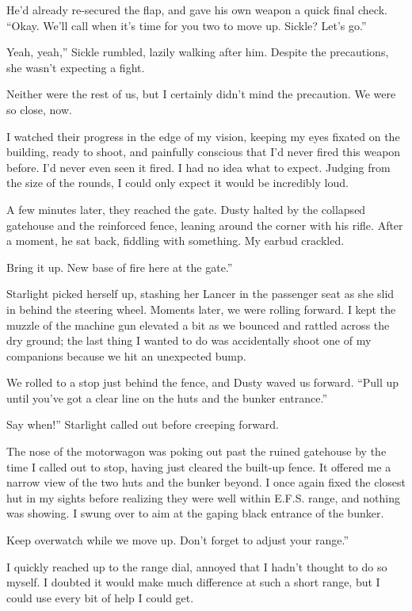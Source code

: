He’d already re-secured the flap, and gave his own weapon a quick final check. “Okay. We’ll call when it’s time for you two to move up. Sickle? Let’s go.”

\leavevmode{}Yeah, yeah,” Sickle rumbled, lazily walking after him. Despite the precautions, she wasn’t expecting a fight.

Neither were the rest of us, but I certainly didn’t mind the precaution. We were so close, now.

I watched their progress in the edge of my vision, keeping my eyes fixated on the building, ready to shoot, and painfully conscious that I’d never fired this weapon before. I’d never even seen it fired. I had no idea what to expect. Judging from the size of the rounds, I could only expect it would be incredibly loud.

A few minutes later, they reached the gate. Dusty halted by the collapsed gatehouse and the reinforced fence, leaning around the corner with his rifle. After a moment, he sat back, fiddling with something. My earbud crackled.

\leavevmode{}Bring it up. New base of fire here at the gate.”

Starlight picked herself up, stashing her Lancer in the passenger seat as she slid in behind the steering wheel. Moments later, we were rolling forward. I kept the muzzle of the machine gun elevated a bit as we bounced and rattled across the dry ground; the last thing I wanted to do was accidentally shoot one of my companions because we hit an unexpected bump.

We rolled to a stop just behind the fence, and Dusty waved us forward. “Pull up until you’ve got a clear line on the huts and the bunker entrance.”

\leavevmode{}Say when!” Starlight called out before creeping forward.

The nose of the motorwagon was poking out past the ruined gatehouse by the time I called out to stop, having just cleared the built-up fence. It offered me a narrow view of the two huts and the bunker beyond. I once again fixed the closest hut in my sights before realizing they were well within E.F.S. range, and nothing was showing. I swung over to aim at the gaping black entrance of the bunker.

\leavevmode{}Keep overwatch while we move up. Don’t forget to adjust your range.”

I quickly reached up to the range dial, annoyed that I hadn’t thought to do so myself. I doubted it would make much difference at such a short range, but I could use every bit of help I could get.

